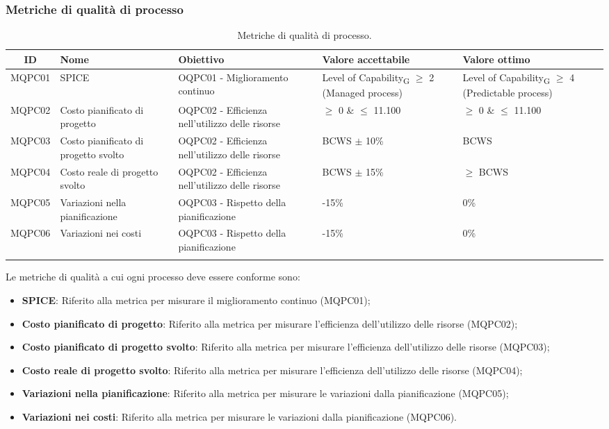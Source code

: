 \subsubsection{Metriche di qualità di processo}
\begin{table}[H]
	\centering
	\begin{tabularx}{\textwidth}{|c|X|X|X|X|}
		\hline
		\textbf{ID} & \textbf{Nome} & \textbf{Obiettivo} & \textbf{Valore accettabile} & \textbf{Valore ottimo}\\
		\hline
		MQPC01 & SPICE & OQPC01 - Miglioramento continuo & Level of Capability\textsubscript{G} $\geq$ 2 (Managed process) & Level of Capability\textsubscript{G} $\geq$ 4 (Predictable process) \\
		\hline
		MQPC02 & Costo pianificato di progetto & OQPC02 - Efficienza nell'utilizzo delle risorse & $\geq$ 0 \& $\le$ 11.100 & $\geq$ 0 \& $\le$ 11.100\\
		\hline
		MQPC03 & Costo pianificato di progetto svolto & OQPC02 - Efficienza nell'utilizzo delle risorse & BCWS $ \pm $ 10\% & BCWS \\
		\hline
		MQPC04 & Costo reale di progetto svolto & OQPC02 - Efficienza nell'utilizzo delle risorse & BCWS $ \pm $ 15\% & $\geq$ BCWS \\
		\hline
		MQPC05 & Variazioni nella pianificazione & OQPC03 - Rispetto della pianificazione & -15\% & 0\% \\
		\hline
		MQPC06 & Variazioni nei costi & OQPC03 - Rispetto della pianificazione & -15\% & 0\% \\
		\hline
		\caption{Metriche di qualità di processo.}
	\end{tabularx}
\end{table}
Le metriche di qualità a cui ogni processo deve essere conforme sono:
\begin{itemize}
	\item \textbf{SPICE}: Riferito alla metrica per misurare il miglioramento continuo (MQPC01);
	\item \textbf{Costo pianificato di progetto}: Riferito alla metrica per misurare l'efficienza dell'utilizzo delle risorse (MQPC02);
	\item \textbf{Costo pianificato di progetto svolto}: Riferito alla metrica per misurare l'efficienza dell'utilizzo delle risorse (MQPC03);
	\item \textbf{Costo reale di progetto svolto}: Riferito alla metrica per misurare l'efficienza dell'utilizzo delle risorse (MQPC04);
	\item \textbf{Variazioni nella pianificazione}: Riferito alla metrica per misurare le variazioni dalla pianificazione (MQPC05);
	\item \textbf{Variazioni nei costi}: Riferito alla metrica per misurare le variazioni dalla pianificazione (MQPC06).
\end{itemize}
